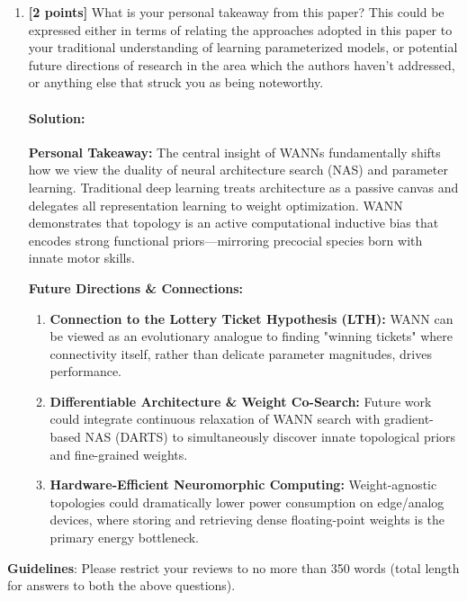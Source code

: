 \documentclass[11pt,english]{article}
\begin{document}
\begin{enumerate}[resume]
\newpage

\item
\textbf{[2 points]}
What is your personal takeaway from this paper? This could be expressed either in terms of relating the approaches adopted in this paper to your traditional understanding of learning parameterized models, or potential future directions of research in the area which the authors haven't addressed, or anything else that struck you as being noteworthy. 

\paragraph{Solution:}

\textbf{Personal Takeaway:}
The central insight of WANNs fundamentally shifts how we view the duality of neural architecture search (NAS) and parameter learning. Traditional deep learning treats architecture as a passive canvas and delegates all representation learning to weight optimization. WANN demonstrates that topology is an active computational inductive bias that encodes strong functional priors—mirroring precocial species born with innate motor skills.

\textbf{Future Directions \& Connections:}
\begin{enumerate}[leftmargin=*]
    \item \textbf{Connection to the Lottery Ticket Hypothesis (LTH):} WANN can be viewed as an evolutionary analogue to finding "winning tickets" where connectivity itself, rather than delicate parameter magnitudes, drives performance.
    \item \textbf{Differentiable Architecture \& Weight Co-Search:} Future work could integrate continuous relaxation of WANN search with gradient-based NAS (DARTS) to simultaneously discover innate topological priors and fine-grained weights.
    \item \textbf{Hardware-Efficient Neuromorphic Computing:} Weight-agnostic topologies could dramatically lower power consumption on edge/analog devices, where storing and retrieving dense floating-point weights is the primary energy bottleneck.
\end{enumerate}

\end{enumerate}

\textbf{Guidelines}: Please restrict your reviews to no more than 350 words (total length for answers to both the above questions).
\end{document}
